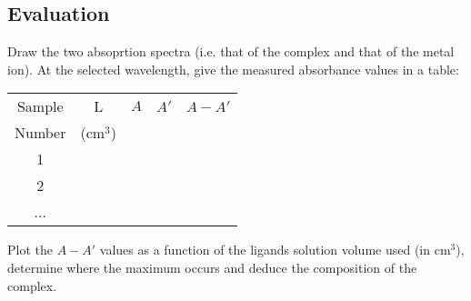 \subsection{Evaluation}

Draw the two absoprtion spectra (i.e. that of the complex and that of the metal ion). At the selected wavelength, give the measured absorbance values in a table:


\begin{table}[H]
\centering
\begin{tabular}{|c|c|c|c|c|}
\hline
Sample & L & $A$ & $A'$ & $A-A'$ \\

Number   & (cm$^3$) &  &  &  \\

\hline
1 &   &   &   &    \\

\hline
2 &   &   &  &    \\

\hline
... &   &   &  &   \\

\hline
\end{tabular}
\end{table}

Plot the $A-A'$ values as a function of the ligands solution volume used (in cm$^3$), determine where the maximum occurs and deduce the composition of the complex.
